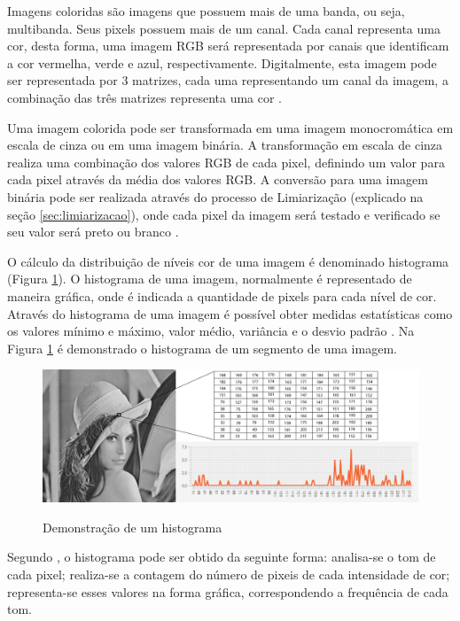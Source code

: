 \documentclass[
	12pt,				%
	oneside,			%
	a4paper,			%
	english,			%
	french,				%
	spanish,			%
	brazil,				%
	]{abntex2}
\begin{document}
Imagens coloridas são imagens que possuem mais de uma banda, ou seja, multibanda. Seus pixels possuem mais de um canal. Cada canal representa uma cor, desta forma, uma imagem RGB será representada por canais que identificam a cor vermelha, verde e azul, respectivamente. Digitalmente, esta imagem pode ser representada por 3 matrizes, cada uma representando um canal da imagem, a combinação das três matrizes representa uma cor \cite{conciAzevedoLeta:2008}.

Uma imagem colorida pode ser transformada em uma imagem monocromática em escala de cinza ou em uma imagem binária. A transformação em escala de cinza realiza uma combinação dos valores RGB de cada pixel, definindo um valor para cada pixel através da média dos valores RGB. A conversão para uma imagem binária pode ser realizada através do processo de Limiarização (explicado na seção \ref{sec:limiarizacao}), onde cada pixel da imagem será testado e verificado se seu valor será preto ou branco \cite{mossmann2010extraccao}.

O cálculo da distribuição de níveis cor de uma imagem é denominado histograma (Figura \ref{fig:histograma}). O histograma de uma imagem, normalmente é representado de maneira gráfica, onde é indicada a quantidade de pixels para cada nível de cor. Através do histograma de uma imagem é possível obter medidas estatísticas como os valores mínimo e máximo, valor médio, variância e o desvio padrão \cite{gonzalesWoods:2008}. Na Figura \ref{fig:histograma} é demonstrado o histograma de um segmento de uma imagem. 

\begin{figure}[ht]
\centering
\caption{Demonstração de um histograma}
\includegraphics[width=1\textwidth]{imagens/histograma.png}
\label{fig:histograma}
\sourceAuthor
\end{figure}

Segundo \citet{conciAzevedoLeta:2008}, o histograma pode ser obtido da seguinte forma: analisa-se o tom de cada pixel; realiza-se a contagem do número de pixeis de cada intensidade de cor; representa-se esses valores na forma gráfica, correspondendo a frequência de cada tom.
\end{document}
